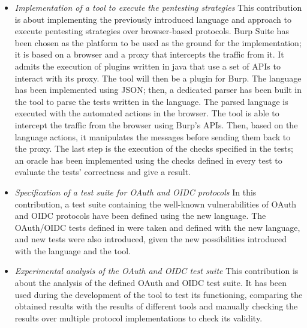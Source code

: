 \begin{itemize}
    \item \textit{Implementation of a tool to execute the pentesting strategies} This contribution is about implementing the previously introduced language and approach to execute pentesting strategies over browser-based protocols. Burp Suite has been chosen as the platform to be used as the ground for the implementation; it is based on a browser and a proxy that intercepts the traffic from it. It admits the execution of plugins written in java that use a set of APIs to interact with its proxy. The tool will then be a plugin for Burp. The language has been implemented using JSON; then, a dedicated parser has been built in the tool to parse the tests written in the language. The parsed language is executed with the automated actions in the browser. The tool is able to intercept the traffic from the browser using Burp's APIs. Then, based on the language actions, it manipulates the messages before sending them back to the proxy. The last step is the execution of the checks specified in the tests; an oracle has been implemented using the checks defined in every test to evaluate the tests' correctness and give a result.
    \item \textit{Specification of a test suite for OAuth and OIDC protocols} In this contribution, a test suite containing the well-known vulnerabilities of OAuth and OIDC protocols have been defined using the new language. The OAuth/OIDC tests defined in \cite{claudio_grisenti, wendy_barreto} were taken and defined with the new language, and new tests were also introduced, given the new possibilities introduced with the language and the tool.
    \item \textit{Experimental analysis of the OAuth and OIDC test suite} This contribution is about the analysis of the defined OAuth and OIDC test suite. It has been used during the development of the tool to test its functioning, comparing the obtained results with the results of different tools and manually checking the results over multiple protocol implementations to check its validity.
\end{itemize}

